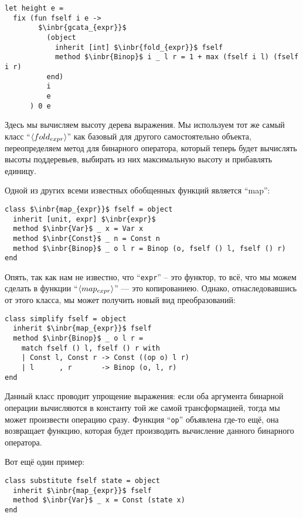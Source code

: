 \begin{lstlisting}
let height e =
  fix (fun fself i e ->
        $\inbr{gcata_{expr}}$ 
          (object 
            inherit [int] $\inbr{fold_{expr}}$ fself
            method $\inbr{Binop}$ i _ l r = 1 + max (fself i l) (fself i r) 
          end) 
          i 
          e
      ) 0 e
\end{lstlisting}

Здесь мы вычисляем высоту дерева выражения. Мы используем тот же самый класс ``$\left<fold_{expr}\right>$'' как базовый для другого самостоятельно объекта, переопределяем метод для бинарного оператора, который теперь будет вычислять высоты поддеревьев, выбирать из них максимальную высоту и прибавлять единицу.

Одной из других всеми известных обобщенных функций является ``map'':

\begin{lstlisting}
class $\inbr{map_{expr}}$ fself = object 
  inherit [unit, expr] $\inbr{expr}$
  method $\inbr{Var}$ _ x = Var x
  method $\inbr{Const}$ _ n = Const n
  method $\inbr{Binop}$ _ o l r = Binop (o, fself () l, fself () r)
end
\end{lstlisting}

Опять, так как нам не известно, что ``\lstinline{expr}'' -- это функтор, то всё, что мы можем сделать в функции ``$\left<map_{expr}\right>$'' --- 
это копированиею. Однако, отнаследовавшись от этого класса, мы может получить новый вид преобразований:

\begin{lstlisting}
class simplify fself = object 
  inherit $\inbr{map_{expr}}$ fself
  method $\inbr{Binop}$ _ o l r =
    match fself () l, fself () r with
    | Const l, Const r -> Const ((op o) l r)
    | l      , r       -> Binop (o, l, r)     
end
\end{lstlisting}

Данный класс проводит упрощение выражения: если оба аргумента бинарной операции вычисляются в константу той же самой трансформацией, тогда 
мы может произвести операцию сразу. Функция ``\lstinline{op}'' объявлена где-то ещё, она возвращает функцию, которая будет производить вычисление данного бинарного оператора.

Вот ещё один пример:

\begin{lstlisting}
class substitute fself state = object 
  inherit $\inbr{map_{expr}}$ fself
  method $\inbr{Var}$ _ x = Const (state x)  
end
\end{lstlisting}

